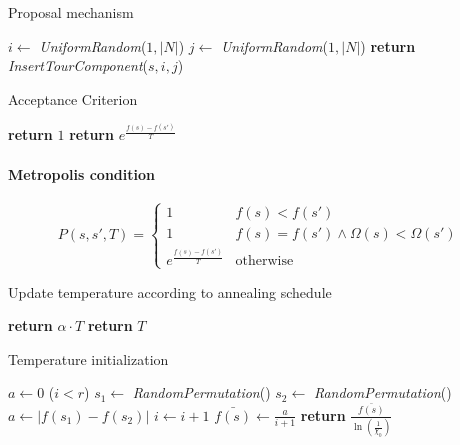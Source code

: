 \begin{homeworkProblem}
\begin{algorithm}
\caption{Proposal mechanism}
\label{SA:Prop}
\begin{algorithmic}
  \State $i \gets $ \emph{UniformRandom}($1,|N|$)
    \State $j \gets $ \emph{UniformRandom}($1,|N|$)
  \EndWhile  
  \State \textbf{return} \emph{InsertTourComponent}($s,i,j$)   
\EndProcedure
\end{algorithmic}
\end{algorithm}

\begin{algorithm}
\caption{Acceptance Criterion}
\label{saTSPTW}
\begin{algorithmic}
  \State \textbf{return} $1$
\Else
  \State \textbf{return} $e^{\frac{f(s)-f(s')}{T}}$
\EndIf
\EndProcedure
\end{algorithmic}
\end{algorithm}

\paragraph{Metropolis condition}
\begin{equation} \label{eq:metropolis}
  P(s,s',T) = \begin{cases}
               1 & f(s) < f(s') \\
               1 & f(s) = f(s') \wedge \Omega(s) < \Omega(s')\\
               e^{\frac{f(s)-f(s')}{T}} & \text{otherwise}
              \end{cases}
\end{equation}

\begin{algorithm}
\caption{Update temperature according to annealing schedule}
\label{saTSPTW}
\begin{algorithmic}
    \State \textbf{return} $\alpha \cdot T$
  \Else
    \State \textbf{return} $T$
  \EndIf
\EndProcedure
\end{algorithmic}
\end{algorithm}

\begin{algorithm}
\caption{Temperature initialization}
\label{saTInit}
\begin{algorithmic}
  \State $a \gets 0$
  \While($i < r$)
    \State $s_1 \gets$ \emph{RandomPermutation}()
    \State $s_2 \gets$ \emph{RandomPermutation}()
    \State $a \gets |f(s_1)-f(s_2)|$
    \State $i \gets i + 1$
  \EndWhile
  \State $\bar{f(s)} \gets \frac{a}{i+1}$
  \State \textbf{return} $\frac{\bar{f(s)}}{\ln(\frac{1}{\chi_0})}$
\EndProcedure
\end{algorithmic}
\end{algorithm}




\end{homeworkProblem}

